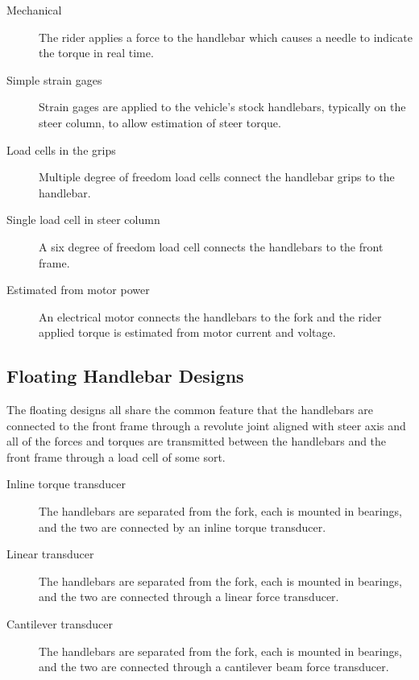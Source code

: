 \documentclass[10pt]{article}
\begin{document}
\begin{description}
  \item[Mechanical] The rider applies a force to the handlebar which causes a
    needle to indicate the torque in real
    time.~\cite{Wilson-Jones1951,Cheng2003,Moore2012}
  \item[Simple strain gages] Strain gages are applied to the vehicle's stock
    handlebars, typically on the steer column, to allow estimation of steer
    torque.~\cite{Eaton1973,Lorenzo1997,Capitani2006}
  \item[Load cells in the grips] Multiple degree of freedom load cells connect
    the handlebar grips to the handlebar.~\cite{Evertse2010}
  \item[Single load cell in steer column] A six degree of freedom load cell
    connects the handlebars to the front frame.~\cite{Kageyama?}
  \item[Estimated from motor power] An electrical motor connects the handlebars
    to the fork and the rider applied torque is estimated from motor current
    and voltage.~\cite{Iuchi2006,Appelman2012,Peterson2013}
\end{description}


\subsection*{Floating Handlebar Designs}

The floating designs all share the common feature that the handlebars are
connected to the front frame through a revolute joint aligned with steer axis
and all of the forces and torques are transmitted between the handlebars and
the front frame through a load cell of some sort.

\begin{description}
  \item[Inline torque transducer] The handlebars are separated from the fork,
    each is mounted in bearings, and the two are connected by an inline torque
    transducer.~\cite{Weir1979a,Cain2010,Cain2012,Moore2012}
  \item[Linear transducer] The handlebars are separated from the fork, each is
    mounted in bearings, and the two are connected through a linear force
    transducer.~\cite{Cheng2003,James2002,Teerhuis2010}
  \item[Cantilever transducer] The handlebars are separated from the fork, each
    is mounted in bearings, and the two are connected through a cantilever beam
    force transducer.~ \cite{Bortoluzzi2000,Biral2003,Ouden2011}
\end{description}
\end{document}
